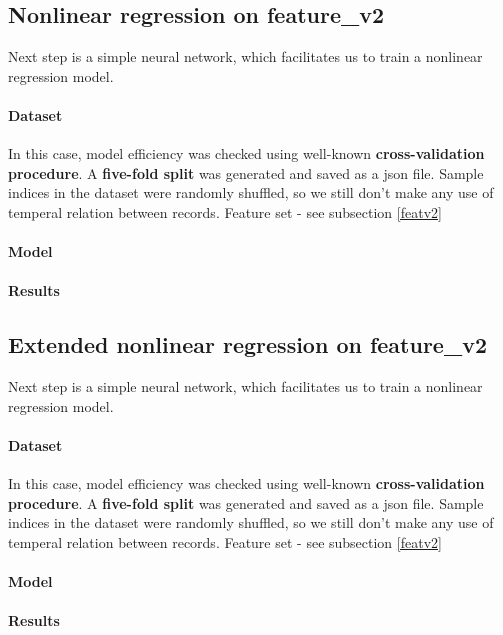 \documentclass[12pt,twoside,a4paper]{memoir}
\begin{document}
\subsection{Nonlinear regression on feature\_v2}
Next step is a simple neural network, which facilitates us to train a nonlinear regression model. 

\paragraph{Dataset}
In this case, model efficiency was checked using well-known \textbf{cross-validation procedure}. A \textbf{five-fold split} was generated and saved as a json file. Sample indices in the dataset were randomly shuffled, so we still don't make any use of temperal relation between records. Feature set - see subsection \ref{featv2}

\paragraph{Model}

\paragraph{Results}


\subsection{Extended nonlinear regression on feature\_v2}
Next step is a simple neural network, which facilitates us to train a nonlinear regression model. 

\paragraph{Dataset}
In this case, model efficiency was checked using well-known \textbf{cross-validation procedure}. A \textbf{five-fold split} was generated and saved as a json file. Sample indices in the dataset were randomly shuffled, so we still don't make any use of temperal relation between records. Feature set - see subsection \ref{featv2}

\paragraph{Model}

\paragraph{Results}
\end{document}
